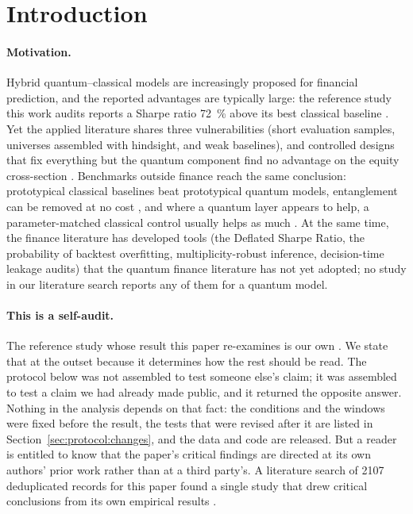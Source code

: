 \section{Introduction}
\label{sec:intro}

\paragraph{Motivation.}
Hybrid quantum--classical models are increasingly proposed for financial
prediction, and the reported advantages are typically large: the reference
study this work audits reports a Sharpe ratio \SI{72}{\percent} above its best
classical baseline \citep{chen2025quantumb}. Yet the applied literature
shares three vulnerabilities (short evaluation samples, universes assembled
with hindsight, and weak baselines), and controlled designs that fix
everything but the quantum component find no advantage on the equity
cross-section \citep{shen2026quantum,kobayashi2023cross}. Benchmarks outside
finance reach the same conclusion: prototypical classical baselines beat
prototypical quantum models, entanglement can be removed at no cost
\citep{bowles2024better}, and where a quantum layer appears to help, a
parameter-matched classical control usually helps as much
\citep{gillani2026quantum}. At the same time, the finance literature has
developed tools (the Deflated Sharpe Ratio, the probability of backtest
overfitting, multiplicity-robust inference, decision-time leakage audits)
that the quantum finance literature has not yet adopted; no study in our
literature search reports any of them for a quantum model.

\paragraph{This is a self-audit.}
The reference study whose result this paper re-examines is our own
\citep{chen2025quantumb}. We state that at the outset because it determines how
the rest should be read. The protocol below was not assembled to test someone
else's claim; it was assembled to test a claim we had already made public, and it
returned the opposite answer. Nothing in the analysis depends on that fact:
the conditions and the windows were fixed before the result, the tests that were
revised after it are listed in Section~\ref{sec:protocol:changes}, and the data
and code are released. But a reader is entitled to know
that the paper's critical findings are directed at its own authors' prior work
rather than at a third party's. A literature search of \num{2107} deduplicated
records for this paper found a single study that drew critical conclusions from
its own empirical results \citep{bowles2024better}.

